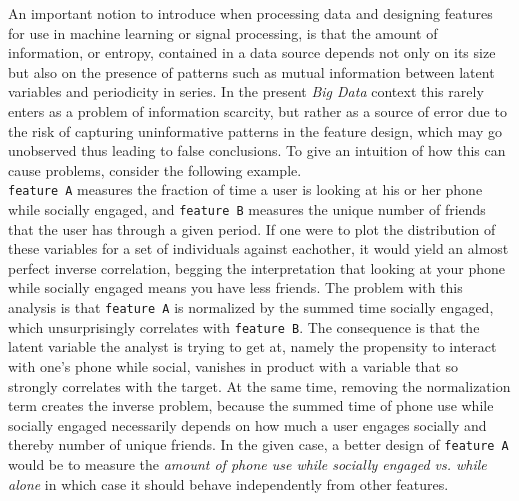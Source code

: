 An important notion to introduce when processing data and designing features for use in machine learning or signal processing, is that the amount of information, or entropy, contained in a data source depends not only on its size but also on the presence of patterns such as mutual information between latent variables and periodicity in series. In the present \textit{Big Data} context this rarely enters as a problem of information scarcity, but rather as a source of error due to the risk of capturing uninformative patterns in the feature design, which may go unobserved thus leading to false conclusions. To give an intuition of how this can cause problems, consider the following example.\\

\texttt{feature A} measures the fraction of time a user is looking at his or her phone while socially engaged, and \texttt{feature B} measures the unique number of friends that the user has through a given period. If one were to plot the distribution of these variables for a set of individuals against eachother, it would yield an almost perfect inverse correlation, begging the interpretation that looking at your phone while socially engaged means you have less friends. The problem with this analysis is that \texttt{feature A} is normalized by the summed time socially engaged, which unsurprisingly correlates with \texttt{feature B}. The consequence is that the latent variable the analyst is trying to get at, namely the propensity to interact with one's phone while social, vanishes in product with a variable that so strongly correlates with the target. At the same time, removing the normalization term creates the inverse problem, because the summed time of phone use while socially engaged necessarily depends on how much a user engages socially and thereby number of unique friends. In the given case, a better design of \texttt{feature A} would be to measure the \textit{amount of phone use while socially engaged vs. while alone} in which case it should behave independently from other features.\\

